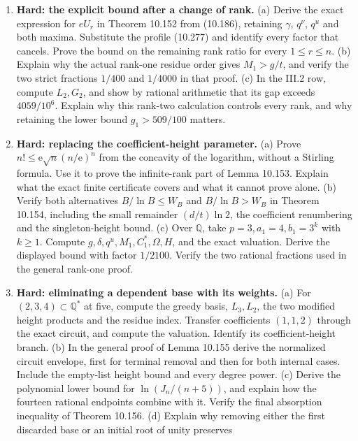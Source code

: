 \documentclass[
  11pt,
  a4paper,
]{article}
\begin{document}
\begin{enumerate}
\def\labelenumi{\arabic{enumi}.}
\setcounter{enumi}{60}
\item
  \textbf{Hard: the explicit bound after a change of rank.} (a) Derive
  the exact expression for \(eU_r\) in Theorem 10.152 from (10.186),
  retaining \(\gamma\), \(q^\nu\), \(q^u\) and both maxima. Substitute
  the profile (10.277) and identify every factor that cancels. Prove the
  bound on the remaining rank ratio for every \(1\le r\le n\). (b)
  Explain why the actual rank-one residue order gives \(M_1>g/t\), and
  verify the two strict fractions \(1/400\) and \(1/4000\) in that
  proof. (c) In the III.2 row, compute \(L_2,G_2\), and show by rational
  arithmetic that its gap exceeds \(4059/10^6\). Explain why this
  rank-two calculation controls every rank, and why retaining the lower
  bound \(g_1>509/100\) matters.
\item
  \textbf{Hard: replacing the coefficient-height parameter.} (a) Prove
  \(n!\le\mathrm e\sqrt n(n/\mathrm e)^n\) from the concavity of the
  logarithm, without a Stirling formula. Use it to prove the
  infinite-rank part of Lemma 10.153. Explain what the exact finite
  certificate covers and what it cannot prove alone. (b) Verify both
  alternatives \(B/\ln B\le W_B\) and \(B/\ln B>W_B\) in Theorem 10.154,
  including the small remainder \((d/t)\ln2\), the coefficient
  renumbering and the singleton-height bound. (c) Over \(\mathbb Q\),
  take \(p=3,a_1=4,b_1=3^k\) with \(k\ge1\). Compute
  \(g,\delta,q^u,M_1,C_1^*,\Omega,H\), and the exact valuation. Derive
  the displayed bound with factor \(1/2100\). Verify the two rational
  fractions used in the general rank-one proof.
\item
  \textbf{Hard: eliminating a dependent base with its weights.} (a) For
  \((2,3,4)\subset\mathbb Q^*\) at five, compute the greedy basis,
  \(L_3,L_2\), the two modified height products and the residue index.
  Transfer coefficients \((1,1,2)\) through the exact circuit, and
  compute the valuation. Identify its coefficient-height branch. (b) In
  the general proof of Lemma 10.155 derive the normalized circuit
  envelope, first for terminal removal and then for both internal cases.
  Include the empty-list height bound and every degree power. (c) Derive
  the polynomial lower bound for \(\ln(J_n/(n+5))\), and explain how the
  fourteen rational endpoints combine with it. Verify the final
  absorption inequality of Theorem 10.156. (d) Explain why removing
  either the first discarded base or an initial root of unity preserves

\end{enumerate}
\end{document}
